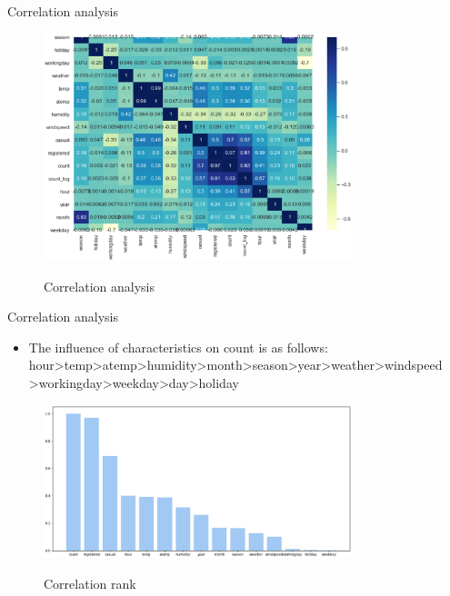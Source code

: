 \documentclass[
 size=14pt,
 paper=smartboard,  %
 mode=present, 		%
 display=slides, 	%
 style=tuliplab,  	%
 pauseslide,
 fleqn,leqno]{powerdot}
\begin{document}
\begin{slide}{Correlation analysis}
  \vspace{-1cm}
  \begin{figure}
  \centering
  \includegraphics[width=0.8\textwidth]{figures//cor.eps}\\
  \caption{Correlation analysis} \label{framework}
\end{figure}


\end{slide}
\begin{slide}[toc=,bm=]{Correlation analysis}
  \begin{itemize}
    \item
    The influence of characteristics on count is as follows: 
    hour>temp>atemp>humidity>month>season>year>weather>windspeed
    >workingday>weekday>day>holiday
    \end{itemize}
  \vspace{-0.8cm}
  \begin{figure}
    \centering
    \includegraphics[width=0.8\textwidth]{figures//cor_rank.eps}\\
    \caption{Correlation rank} \label{framework}
  \end{figure}
  
  
  \end{slide}
  
\end{document}
